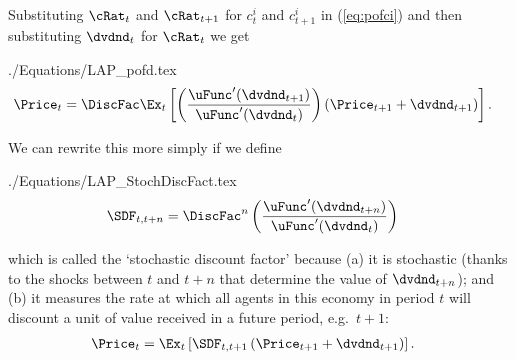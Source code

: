 \documentclass{handout}
\begin{document}
\hypertarget{pofd}{}
Substituting $\cRat_{t}$ and $\cRat_{t+1}$ for $c_{t}^{i}$ and $c_{t+1}^{i}$ in  (\ref{eq:pofci}) and then
substituting $\dvdnd_{t}$ for $\cRat_{t}$ we get
\begin{verbatimwrite}{./Equations/LAP_pofd.tex}
\begin{equation}\begin{gathered}\begin{aligned}
 \Price_{t} & =  \DiscFac \Ex_{t}\left[\left(\frac{\uFunc^{\prime}(\dvdnd_{t+1})}{\uFunc^{\prime}(\dvdnd_{t})}\right)\left({\Price}_{t+1}+\dvdnd_{t+1}\right)\right] \label{eq:pofd}.
\end{aligned}\end{gathered}\end{equation}
\end{verbatimwrite}



We can rewrite this more simply if we define
\begin{verbatimwrite}{./Equations/LAP_StochDiscFact.tex}
\begin{equation}\begin{gathered}\begin{aligned}
  \label{eq:StochDiscFact}
  \SDF_{t,t+n} & =  \DiscFac^{n} \left(\frac{\uFunc^{\prime}(\dvdnd_{t+n})}{\uFunc^{\prime}(\dvdnd_{t})}\right)
\end{aligned}\end{gathered}\end{equation}
\end{verbatimwrite}

which is called the `stochastic discount factor' because (a) it is stochastic (thanks to the shocks between $t$ and $t+n$ that determine the value of $\dvdnd_{t+n}$); and (b) it measures the rate at which all agents in this economy in period $t$ will discount a unit of value received in a future period, e.g.\ $t+1$: \hypertarget{Pt}{}
\begin{equation}\begin{gathered}\begin{aligned}
 \Price_{t} & =  \Ex_{t}\left[\SDF_{t,t+1}\left({\Price}_{t+1}+\dvdnd_{t+1}\right)\right] . \label{eq:Pt}
\end{aligned}\end{gathered}\end{equation}
\end{document}
